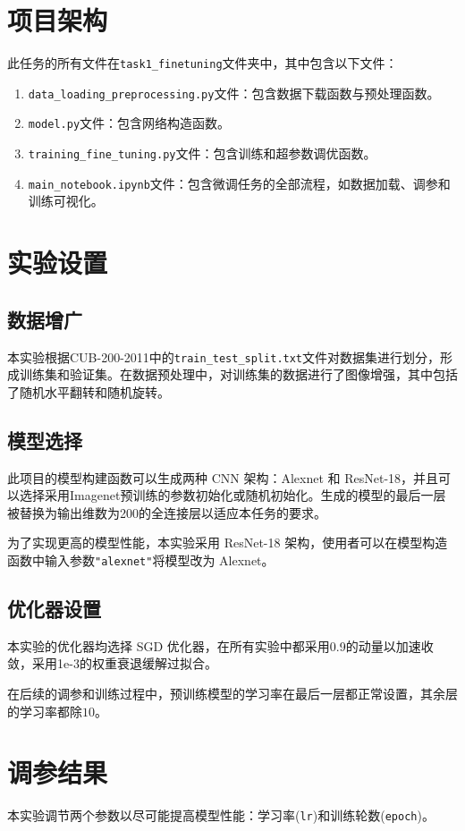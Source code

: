 \documentclass[notitlepage,cs4size,punct,oneside]{ctexrep}
\numberwithin{equation}{chapter}
\theoremstyle{mystyle}
\begin{document}
\section{项目架构}
此任务的所有文件在\texttt{task1\_finetuning}文件夹中，其中包含以下文件：
\begin{enumerate}
\item \texttt{data\_loading\_preprocessing.py}文件：包含数据下载函数与预处理函数。
\item \texttt{model.py}文件：包含网络构造函数。
\item \texttt{training\_fine\_tuning.py}文件：包含训练和超参数调优函数。
\item \texttt{main\_notebook.ipynb}文件：包含微调任务的全部流程，如数据加载、调参和训练可视化。
\end{enumerate}

\section{实验设置}
\subsection{数据增广}
本实验根据CUB-200-2011中的\texttt{train\_test\_split.txt}文件对数据集进行划分，形成训练集和验证集。在数据预处理中，对训练集的数据进行了图像增强，其中包括了随机水平翻转和随机旋转。

\subsection{模型选择}
此项目的模型构建函数可以生成两种 CNN 架构：Alexnet 和 ResNet-18，并且可以选择采用Imagenet预训练的参数初始化或随机初始化。生成的模型的最后一层被替换为输出维数为200的全连接层以适应本任务的要求。

为了实现更高的模型性能，本实验采用 ResNet-18 架构，使用者可以在模型构造函数中输入参数\texttt{"alexnet"}将模型改为 Alexnet。

\subsection{优化器设置}
本实验的优化器均选择 SGD 优化器，在所有实验中都采用0.9的动量以加速收敛，采用1e-3的权重衰退缓解过拟合。

在后续的调参和训练过程中，预训练模型的学习率在最后一层都正常设置，其余层的学习率都除$10$。


\section{调参结果}
本实验调节两个参数以尽可能提高模型性能：学习率(\texttt{lr})和训练轮数(\texttt{epoch})。
\end{document}
